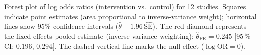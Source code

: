 \caption{Forest plot of log odds ratios (intervention vs.\ control) for 12 studies. Squares indicate point estimates (area proportional to inverse-variance weight); horizontal lines show 95\% confidence intervals ($\hat{\theta} \pm 1.96\,\widehat{\mathrm{SE}}$). The red diamond represents the fixed-effects pooled estimate (inverse-variance weighting): $\hat{\theta}_{\mathrm{FE}} = 0.245$ [95\,\% CI: $0.196$, $0.294$]. The dashed vertical line marks the null effect ($\log\mathrm{OR} = 0$).}
